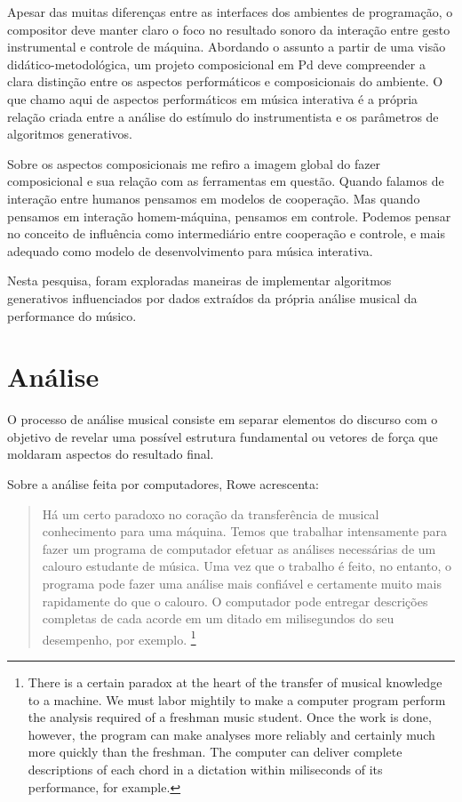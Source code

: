 \documentclass{ppgmus}
\begin{document}
Apesar das muitas diferenças entre
as interfaces dos ambientes de programação, 
o compositor deve manter claro o foco no resultado sonoro  da interação entre
gesto instrumental e controle de máquina.
Abordando o assunto
a partir de uma visão didático-metodológica, um projeto
composicional em Pd deve compreender a clara distinção entre os
aspectos performáticos e composicionais do ambiente. 
O que chamo aqui de aspectos performáticos em música interativa 
é a própria relação criada entre a  análise do estímulo
do instrumentista e os parâmetros de algoritmos generativos.

Sobre os aspectos composicionais me refiro a imagem global
do fazer composicional e sua relação com as ferramentas em questão.
Quando falamos de interação entre humanos pensamos em modelos
de cooperação. Mas quando pensamos em interação homem-máquina, 
pensamos em controle. Podemos pensar no conceito de influência como 
intermediário entre cooperação e controle, e mais adequado como
modelo de desenvolvimento para música interativa.

Nesta pesquisa, foram exploradas maneiras de
implementar algoritmos generativos influenciados por dados
extraídos da própria análise musical da
performance do músico.


\section{Análise}
\label{sec-analise-geral}


O processo de análise musical consiste em separar elementos
do discurso com o objetivo de revelar uma possível estrutura fundamental
ou vetores de força que moldaram aspectos do resultado final.

Sobre a análise feita por computadores, Rowe acrescenta:

\begin{quote}
Há um certo paradoxo no coração da 
transferência de musical
conhecimento para uma máquina. Temos que trabalhar intensamente para fazer um programa de computador
efetuar as análises necessárias de um calouro estudante de música.
Uma vez que o trabalho é feito, no entanto, o programa pode fazer uma análise mais confiável
e certamente muito mais rapidamente do que o calouro. O computador pode entregar
descrições completas de cada acorde em um ditado em milisegundos
do seu desempenho, por exemplo. \cite{rowe2004machine}
\footnote{There is a certain paradox at the heart of the transfer of musical
knowledge to a machine. We must labor mightily to make a computer
program perform the analysis required of a freshman music student.
Once the work is done, however, the program can make analyses more reliably
and certainly much more quickly than the freshman. The computer can deliver 
complete descriptions of each chord in a dictation within miliseconds
of its performance, for example.}
\end{quote}
\end{document}
